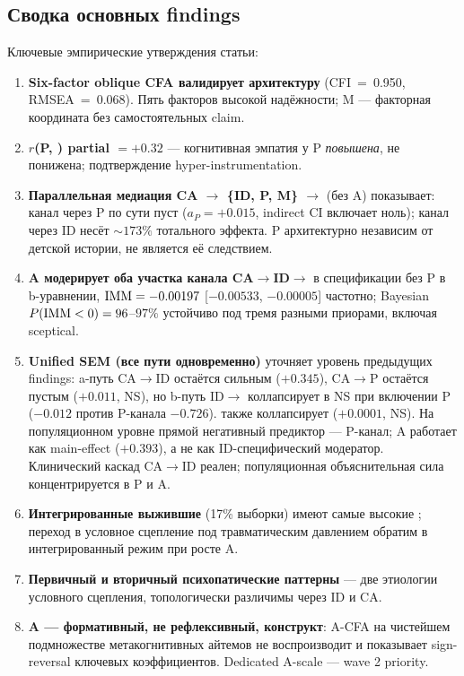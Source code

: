 \subsection{Сводка основных findings}

Ключевые эмпирические утверждения статьи:
\begin{enumerate}
    \item \textbf{Six-factor oblique CFA валидирует архитектуру} (CFI~=~0.950, RMSEA~=~0.068). Пять факторов высокой надёжности; M --- факторная координата без самостоятельных claim.
    \item \textbf{$r$(P, \Ecog{}) partial $= +0.32$} --- когнитивная эмпатия у P \emph{повышена}, не понижена; подтверждение hyper-instrumentation.
    \item \textbf{Параллельная медиация CA $\to$ \{ID, P, M\} $\to$ \EAF{}} (без A) показывает: канал через P по сути пуст ($a_P = +0.015$, indirect CI включает ноль); канал через ID несёт $\sim 173\%$ тотального эффекта. P архитектурно независим от детской истории, не является её следствием.
    \item \textbf{A модерирует оба участка канала CA$\to$ID$\to$\EAF{}} в спецификации без P в b-уравнении, $\mathrm{IMM} = -0.00197$ [$-0.00533$, $-0.00005$] частотно; Bayesian $P(\mathrm{IMM} < 0) = 96$--$97\%$ устойчиво под тремя разными приорами, включая sceptical.
    \item \textbf{Unified SEM (все пути одновременно)} уточняет уровень предыдущих findings: a-путь CA$\to$ID остаётся сильным ($+0.345$), CA$\to$P остаётся пустым ($+0.011$, NS), но b-путь ID$\to$\EAF{} коллапсирует в NS при включении P ($-0.012$ против P-канала $-0.726$). \IMM{} также коллапсирует ($+0.0001$, NS). На популяционном уровне прямой негативный предиктор \EAF{} --- P-канал; A работает как main-effect ($+0.393$), а не как ID-специфический модератор. Клинический каскад CA$\to$ID реален; популяционная объяснительная сила \EAF{} концентрируется в P и A.
    \item \textbf{Интегрированные выжившие} (17\% выборки) имеют самые высокие \EAF{}; переход в условное сцепление под травматическим давлением обратим в интегрированный режим при росте A.
    \item \textbf{Первичный и вторичный психопатические паттерны} --- две этиологии условного сцепления, топологически различимы через ID и CA.
    \item \textbf{A --- формативный, не рефлексивный, конструкт}: A-CFA на чистейшем подмножестве метакогнитивных айтемов не воспроизводит \IMM{} и показывает sign-reversal ключевых коэффициентов. Dedicated A-scale --- wave 2 priority.

\end{enumerate}

